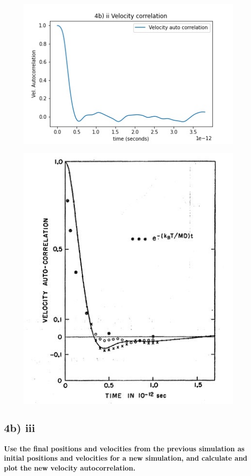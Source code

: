 \documentclass[a4paper,10pt,english]{article}
\begin{document}
\begin{figure}
\centering
\begin{minipage}{.5\textwidth}
  \centering
  \includegraphics[width=.7\linewidth]{./py/4b_ii_velcorr.jpg} 
  \label{fig:test1}
\end{minipage}%
\begin{minipage}{.5\textwidth}
  \centering
  \includegraphics[width=.7\linewidth]{./py/4Rahman.jpg} 
  \label{fig:test2}
\end{minipage}
\end{figure}

\newpage
\subsection*{4b) iii}
\textbf{Use the final positions and velocities from the previous simulation as initial positions and
velocities for a new simulation, and calculate and plot the new velocity autocorrelation.}
\end{document}
